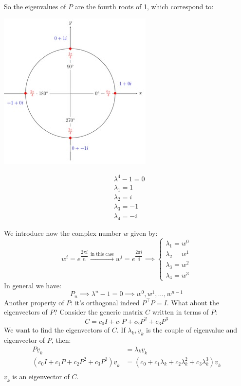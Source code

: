 So the eigenvalues of $P$ are the fourth roots of 1, which correspond to:
\begin{multicols}{2}
    \begin{center}
        \includegraphics[scale = 0.4]{../images/FourthRoots.jpg}
    \end{center}
    \newcolumn
    \vspace{0.2cm}
    \[
        \begin{split}
            &\lambda^4 - 1 = 0\\
            &\lambda_1 = 1\\
            &\lambda_2 = i\\
            &\lambda_3 = -1\\
            &\lambda_4 = -i
        \end{split}    
    \]
\end{multicols}
We introduce now the complex number $w$ given by:
\[
    w^i = e^{\dfrac{2\pi i}{n}} \overset{\text{in this case}}{\longrightarrow}    w^i = e^{\dfrac{2\pi i}{4}} \implies \begin{cases}
        \lambda_1 = w^0\\
        \lambda_2 = w^1\\
        \lambda_3 = w^2\\
        \lambda_4 = w^3
    \end{cases}
\]
In general we have:
\[
    P_n \implies \lambda^n - 1 = 0 \implies w^0, w^1, \dots, w^{n-1}
\]
Another property of $P$: it's orthogonal indeed $P^\intercal P = I$.
What about the eigenvectors of $P$? Consider the generic matrix $C$ written in terms of $P$:
\[
    C = c_0 I + c_1 P + c_2 P^2 + c_3 P^3    
\]
We want to find the eigenvectors of $C$. If $\lambda_k, \underline{v}_k$ is the couple of eigenvalue and eigenvector of $P$, then:
\[
    \begin{split}
        P\underline{v}_k &= \lambda_k \underline{v}_k\\
        (c_0 I + c_1 P + c_2 P^2 + c_3 P^3)\underline{v}_k &= (c_0 + c_1 \lambda_k + c_2 \lambda_k^2 + c_3 \lambda_k^3)\underline{v}_k\\
    \end{split}
\]
$\underline{v}_k$ is an eigenvector of $C$.\\




